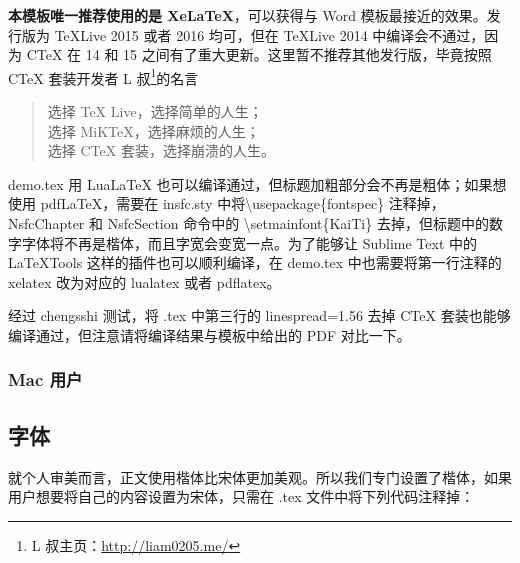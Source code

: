 \documentclass[a4paper,zihao=-4]{article}
\begin{document}
\textbf{本模板唯一推荐使用的是 XeLaTeX}，可以获得与 Word 模板最接近的效果。发行版为 TeXLive 2015 或者 2016 均可，但在 TeXLive 2014 中编译会不通过，因为 CTeX 在 14 和 15 之间有了重大更新。这里暂不推荐其他发行版，毕竟按照 CTeX 套装开发者 L 叔\footnote{L 叔主页：\href{http://liam0205.me/}{http://liam0205.me/}}的名言
\begin{quote}
	选择 TeX Live，选择简单的人生；\\
	选择 MiKTeX，选择麻烦的人生；\\
	选择 CTeX 套装，选择崩溃的人生。
\end{quote}

demo.tex 用 LuaLaTeX 也可以编译通过，但标题加粗部分会不再是粗体；如果想使用 pdfLaTeX，需要在 insfc.sty 中将\textbackslash usepackage\{fontspec\} 注释掉，NsfcChapter 和 NsfcSection 命令中的 \textbackslash setmainfont\{KaiTi\} 去掉，但标题中的数字字体将不再是楷体，而且字宽会变宽一点。为了能够让 Sublime Text 中的 LaTeXTools 这样的插件也可以顺利编译，在 demo.tex 中也需要将第一行注释的 xelatex 改为对应的 lualatex 或者 pdflatex。

经过 chengsshi 测试，将 .tex 中第三行的 linespread=1.56 去掉 CTeX 套装也能够编译通过，但注意请将编译结果与模板中给出的 PDF 对比一下。

\subsubsection{Mac 用户}


\subsection{字体}
就个人审美而言，正文使用楷体比宋体更加美观。所以我们专门设置了楷体，如果用户想要将自己的内容设置为宋体，只需在 .tex 文件中将下列代码注释掉：
\end{document}

